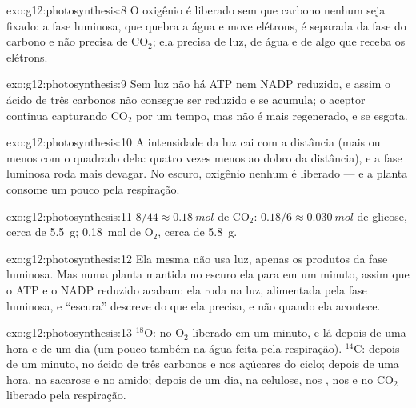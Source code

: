 \begin{solution}{exo:g12:photosynthesis:8}
O oxigênio é liberado sem que carbono nenhum seja fixado: a fase
luminosa, que quebra a água e move elétrons, é separada da fase do
carbono e não precisa de $\mathrm{CO_2}$; ela precisa de luz, de água e
de algo que receba os elétrons.
\end{solution}

\begin{solution}{exo:g12:photosynthesis:9}
Sem luz não há ATP nem NADP reduzido, e assim o ácido de três carbonos
não consegue ser reduzido e se acumula; o aceptor continua capturando
$\mathrm{CO_2}$ por um tempo, mas não é mais regenerado, e se esgota.
\end{solution}

\begin{solution}{exo:g12:photosynthesis:10}
A intensidade da luz cai com a distância (mais ou menos com o quadrado
dela: quatro vezes menos ao dobro da distância), e a fase luminosa roda
mais devagar. No escuro, oxigênio nenhum é liberado --- e a planta
consome um pouco pela respiração.
\end{solution}

\begin{solution}{exo:g12:photosynthesis:11}
$8/44 \approx \qty{0.18}{mol}$ de $\mathrm{CO_2}$: $0.18/6 \approx
\qty{0.030}{mol}$ de glicose, cerca de \qty{5.5}{g}; \qty{0.18}{mol} de
$\mathrm{O_2}$, cerca de \qty{5.8}{g}.
\end{solution}

\begin{solution}{exo:g12:photosynthesis:12}
Ela mesma não usa luz, apenas os produtos da fase luminosa. Mas numa
planta mantida no escuro ela para em um minuto, assim que o ATP e o
NADP reduzido acabam: ela roda na luz, alimentada pela fase luminosa, e
``escura'' descreve do que ela precisa, e não quando ela acontece.
\end{solution}

\begin{solution}{exo:g12:photosynthesis:13}
$^{18}$O: no $\mathrm{O_2}$ liberado em um minuto, e lá depois de uma
hora e de um dia (um pouco também na água feita pela respiração).
$^{14}$C: depois de um minuto, no ácido de três carbonos e nos açúcares
do ciclo; depois de uma hora, na sacarose e no amido; depois de um dia,
na celulose, nos , nos  e no $\mathrm{CO_2}$
liberado pela respiração.
\end{solution}

